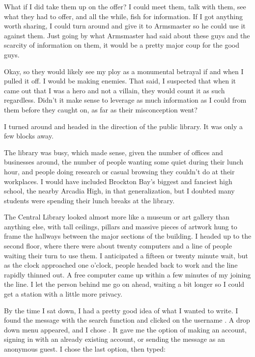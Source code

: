 What if I did take them up on the offer? I could meet them, talk with them, see what they had to offer, and all the while, fish for information. If I got anything worth sharing, I could turn around and give it to Armsmaster so he could use it against them. Just going by what Armsmaster had said about these guys and the scarcity of information on them, it would be a pretty major coup for the good guys.

Okay, so they would likely see my ploy as a monumental betrayal if and when I pulled it off. I would be making enemies. That said, I suspected that when it came out that I was a hero and not a villain, they would count it as such regardless. Didn't it make sense to leverage as much information as I could from them before they caught on, as far as their misconception went?

I turned around and headed in the direction of the public library. It was only a few blocks away.

The library was busy, which made sense, given the number of offices and businesses around, the number of people wanting some quiet during their lunch hour, and people doing research or casual browsing they couldn't do at their workplaces. I would have included Brockton Bay's biggest and fanciest high school, the nearby Arcadia High, in that generalization, but I doubted many students were spending their lunch breaks at the library.

The Central Library looked almost more like a museum or art gallery than anything else, with tall ceilings, pillars and massive pieces of artwork hung to frame the hallways between the major sections of the building. I headed up to the second floor, where there were about twenty computers and a line of people waiting their turn to use them. I anticipated a fifteen or twenty minute wait, but as the clock approached one o'clock, people headed back to work and the line rapidly thinned out. A free computer came up within a few minutes of my joining the line. I let the person behind me go on ahead, waiting a bit longer so I could get a station with a little more privacy.

By the time I sat down, I had a pretty good idea of what I wanted to write. I found the message with the search function and clicked on the username . A drop down menu appeared, and I chose . It gave me the option of making an account, signing in with an already existing account, or sending the message as an anonymous guest. I chose the last option, then typed:

